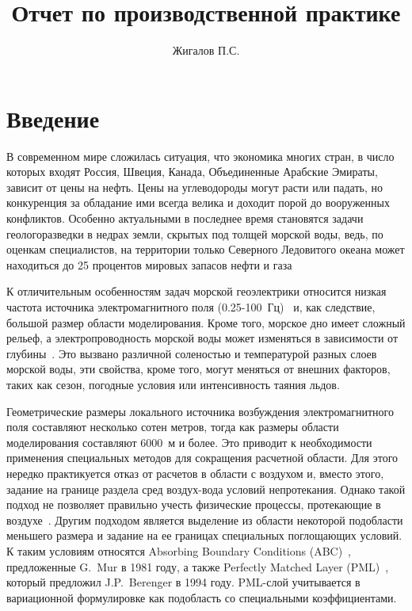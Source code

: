 \documentclass[a4paper,12pt]{article}
\title{Отчет по производственной практике}
\author{Жигалов П.С.}
\begin{document}
\setcounter{page}{2}
\clearpage
\tableofcontents


\clearpage
{}
\section*{Введение}

В современном мире сложилась ситуация, что экономика многих стран, в число которых входят Россия, Швеция, Канада, Объединенные Арабские Эмираты, зависит от цены на нефть. Цены на углеводороды могут расти или падать, но конкуренция за обладание ими всегда велика и доходит порой до вооруженных конфликтов. Особенно актуальными в последнее время становятся задачи геологоразведки в недрах земли, скрытых под толщей морской воды, ведь, по оценкам специалистов, на территории только Северного Ледовитого океана может находиться до 25 процентов мировых запасов нефти и газа~\citep{shurina}

К отличительным особенностям задач морской геоэлектрики относится низкая частота источника электромагнитного поля (0.25-100~Гц)~\citep{gabrielsen} и, как следствие, большой размер области моделирования. Кроме того, морское дно имеет сложный рельеф, а электропроводность морской воды может изменяться в зависимости от глубины~\citep{shurina}. Это вызвано различной соленостью и температурой разных слоев морской воды, эти свойства, кроме того, могут меняться от внешних факторов, таких как сезон, погодные условия или интенсивность таяния льдов.

Геометрические размеры локального источника возбуждения электромагнитного поля составляют несколько сотен метров, тогда как размеры области моделирования составляют 6000~м и более. Это приводит к необходимости применения специальных методов для сокращения расчетной области. Для этого нередко практикуется отказ от расчетов в области с воздухом и, вместо этого, задание на границе раздела сред воздух-вода условий непротекания. Однако такой подход не позволяет правильно учесть физические процессы, протекающие в воздухе~\citep{anderson}. Другим подходом является выделение из области некоторой подобласти меньшего размера и задание на ее границах специальных поглощающих условий. К таким условиям относятся Absorbing Boundary Conditions (ABC)~\citep{mur}, предложенные G.~Mur в 1981 году, а также Perfectly Matched Layer (PML)~\citep{berenger, wiik_dehoop_ursin}, который предложил J.P.~Berenger в 1994 году. PML-слой учитывается в вариационной формулировке как подобласть со специальными коэффициентами.
\end{document}
